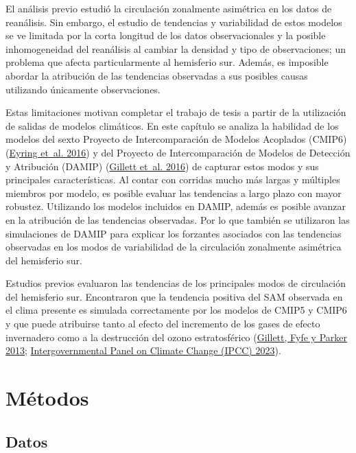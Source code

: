 \documentclass[12pt,oneside,a4paper]{reedthesis}
\begin{document}
El análisis previo estudió la circulación zonalmente asimétrica en los datos de reanálisis.
Sin embargo, el estudio de tendencias y variabilidad de estos modelos se ve limitada por la corta longitud de los datos observacionales y la posible inhomogeneidad del reanálisis al cambiar la densidad y tipo de observaciones; un problema que afecta particularmente al hemisferio sur.
Además, es imposible abordar la atribución de las tendencias observadas a sus posibles causas utilizando únicamente observaciones.

Estas limitaciones motivan completar el trabajo de tesis a partir de la utilización de salidas de modelos climáticos.
En este capítulo se analiza la habilidad de los modelos del sexto Proyecto de Intercomparación de Modelos Acoplados (CMIP6) (\protect\hyperlink{ref-eyring2016}{Eyring et~al. 2016}) y del Proyecto de Intercomparación de Modelos de Detección y Atribución (DAMIP) (\protect\hyperlink{ref-gillett2016}{Gillett et~al. 2016}) de capturar estos modos y sus principales características.
Al contar con corridas mucho más largas y múltiples miembros por modelo, es posible evaluar las tendencias a largo plazo con mayor robustez.
Utilizando los modelos incluidos en DAMIP, además es posible avanzar en la atribución de las tendencias observadas.
Por lo que también se utilizaron las simulaciones de DAMIP para explicar los forzantes asociados con las tendencias observadas en los modos de variabilidad de la circulación zonalmente asimétrica del hemisferio sur.

Estudios previos evaluaron las tendencias de los principales modos de circulación del hemisferio sur.
Encontraron que la tendencia positiva del SAM observada en el clima presente es simulada correctamente por los modelos de CMIP5 y CMIP6 y que puede atribuirse tanto al efecto del incremento de los gases de efecto invernadero como a la destrucción del ozono estratosférico (\protect\hyperlink{ref-gillett2013}{Gillett, Fyfe y Parker 2013}; \protect\hyperlink{ref-ipcc6ch3}{Intergovernmental Panel on Climate Change (IPCC) 2023}).

\hypertarget{muxe9todos-2}{%
\section{Métodos}\label{muxe9todos-2}}

\hypertarget{datos-3}{%
\subsection{Datos}\label{datos-3}}
\end{document}
